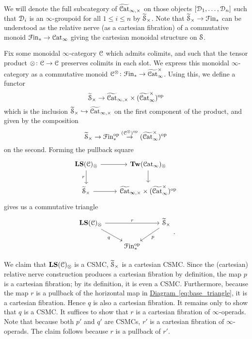 \documentclass[main.tex]{subfiles}
\begin{document}
\begin{construction}
  We will denote the full subcategory of $\TICatCart$ on those objects $[\category{D}_{1}, \ldots, \category{D}_{n}]$ such that $\category{D}_{i}$ is an $\infty$-groupoid for all $1 \leq i \leq n$ by $\TSCart$. Note that $\TSCart \to \Finp$ can be understood as the relative nerve (as a cartesian fibration) of a commutative monoid $\Finp \to \ICat$ giving the cartesian monoidal structure on $\S$.

  Fix some monoidal $\infty$-category $\category{C}$ which admits colimits, and such that the tensor product $\otimes\colon \category{C} \to \category{C}$ preserves colimits in each slot. We express this monoidal $\infty$-category as a commutative monoid $\category{C}^{\otimes}\colon \Finp \to \TICatCocart$. Using this, we define a functor
  \begin{equation*}
    \TSCart \to \TICatCart \times (\TICatCocart)\op
  \end{equation*}
  which is the inclusion $\TSCart \hookrightarrow \TICatCart$ on the first component of the product, and given by the composition
  \begin{equation*}
    \TSCart \to \Finp\op \overset{(\category{C}^{\otimes})\op}{\to} (\TICatCocart)\op
  \end{equation*}
  on the second. Forming the pullback square
  \begin{equation*}
    \begin{tikzcd}
      \LS(\category{C})_{\otimes}
      \arrow[r]
      \arrow[d, swap, "r"]
      & \Tw(\ICat)_{\otimes}
      \arrow[d]
      \\
      \TSCart
      \arrow[r]
      & \TICatCart \times (\TICatCocart)\op
    \end{tikzcd}
  \end{equation*}
  gives us a commutative triangle
  \begin{equation*}
    \begin{tikzcd}
      \LS(\category{C})_{\otimes}
      \arrow[rr, "r"]
      \arrow[dr, swap, "q"]
      && \TSCart
      \arrow[dl, "p"]
      \\
      & \Finp\op
    \end{tikzcd}.
  \end{equation*}

  We claim that $\LS(\category{C})_{\otimes}$ is a CSMC, $\TSCart$ is a cartesian CSMC. Since the (cartesian) relative nerve construction produces a cartesian fibration by definition, the map $p$ is a cartesian fibration; by its definition, it is even a CSMC. Furthermore, because the map $r$ is a pullback of the horizontal map in \hyperref[eq:base_triangle]{Diagram~\ref*{eq:base_triangle}}, it is a cartesian fibration. Hence $q$ is also a cartesian fibration. It remains only to show that $q$ is a CSMC. It suffices to show that $r$ is a cartesian fibration of $\infty$-operads. Note that because both $p'$ and $q'$ are CSMCs, $r'$ is a cartesian fibration of $\infty$-operads. The claim follows because $r$ is a pullback of $r'$.
\end{construction}
\end{document}
